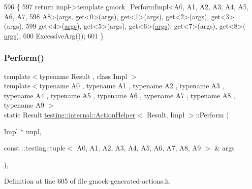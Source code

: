 \begin{DoxyCode}
596                              \{
597     \textcolor{keywordflow}{return} impl->template gmock\_PerformImpl<A0, A1, A2, A3, A4, A5, A6, A7,
598         A8>(\hyperlink{namespacegenerate__debs_a75f9143e38df82d83b2e8a6f99cae02c}{args}, get<0>(\hyperlink{namespacegenerate__debs_a75f9143e38df82d83b2e8a6f99cae02c}{args}), get<1>(args), get<2>(\hyperlink{namespacegenerate__debs_a75f9143e38df82d83b2e8a6f99cae02c}{args}), get<3>(args),
599         get<4>(\hyperlink{namespacegenerate__debs_a75f9143e38df82d83b2e8a6f99cae02c}{args}), get<5>(args), get<6>(\hyperlink{namespacegenerate__debs_a75f9143e38df82d83b2e8a6f99cae02c}{args}), get<7>(args), get<8>(
      \hyperlink{namespacegenerate__debs_a75f9143e38df82d83b2e8a6f99cae02c}{args}),
600         ExcessiveArg());
601   \}
\end{DoxyCode}
\mbox{\label{classtesting_1_1internal_1_1ActionHelper_adfe6c86332cc09b352ec5ccbad1d3988}} 
\subsubsection{\texorpdfstring{Perform()}{Perform()}\hspace{0.1cm}{\footnotesize\ttfamily [11/11]}}
{\footnotesize\ttfamily template$<$typename Result , class Impl $>$ \\
template$<$typename A0 , typename A1 , typename A2 , typename A3 , typename A4 , typename A5 , typename A6 , typename A7 , typename A8 , typename A9 $>$ \\
static Result \hyperlink{classtesting_1_1internal_1_1ActionHelper}{testing\+::internal\+::\+Action\+Helper}$<$ Result, Impl $>$\+::Perform (\begin{DoxyParamCaption}\item[{Impl $\ast$}]{impl,  }\item[{const \+::testing\+::tuple$<$ A0, A1, A2, A3, A4, A5, A6, A7, A8, A9 $>$ \&}]{args }\end{DoxyParamCaption})\hspace{0.3cm}{\ttfamily [inline]}, {\ttfamily [static]}}



Definition at line 605 of file gmock-\/generated-\/actions.\+h.



